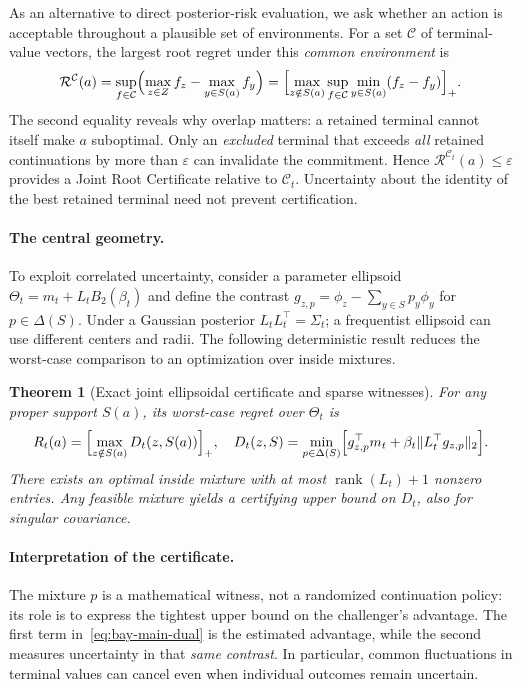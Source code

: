 \documentclass{article}
\theoremstyle{plain}
\newtheorem{theorem}{Theorem}[section]
\theoremstyle{definition}
\begin{document}
As an alternative to direct posterior-risk evaluation, we
ask whether an action is acceptable throughout a plausible
set of environments. For a set $\mathcal C$ of terminal-value
vectors, the largest root regret under this
\emph{common environment} is
\begin{equation}
 \mathcal R^{\mathcal C}(a)
 =\sup_{f\in\mathcal C}
 \Bigl(\max_{z\in Z}f_z-\max_{y\in S(a)}f_y\Bigr)
 =\Bigl[\max_{z\notin S(a)}\sup_{f\in\mathcal C}
 \min_{y\in S(a)}(f_z-f_y)\Bigr]_+.
 \label{eq:robust-definition}
\end{equation}
The second equality reveals why overlap matters: a retained
terminal cannot itself make $a$ suboptimal. Only an
\emph{excluded} terminal that exceeds \emph{all} retained
continuations by more than $\varepsilon$ can invalidate the
commitment. Hence $\mathcal R^{\mathcal C_t}(a)\le\varepsilon$
provides a Joint Root Certificate relative to $\mathcal C_t$.
Uncertainty about the identity of the best retained terminal
need not prevent certification.

\paragraph{The central geometry.}
\label{sec:bay-main}\label{sec:cd-main}
To exploit correlated uncertainty, consider a parameter
ellipsoid $\Theta_t=m_t+L_tB_2(\beta_t)$ and define the
contrast $g_{z,p}=\phi_z-\sum_{y\in S}p_y\phi_y$ for
$p\in\Delta(S)$. Under a Gaussian posterior
$L_tL_t^\top=\Sigma_t$; a frequentist ellipsoid can use
different centers and radii. The following deterministic
result reduces the worst-case comparison to an optimization
over inside mixtures.

\begin{theorem}[Exact joint ellipsoidal certificate and sparse witnesses]
\label{thm:bay-main-dual}\label{thm:t1-dual}
For any proper support $S(a)$, its worst-case regret over
$\Theta_t$ is
\begin{equation}
 R_t(a)=\Bigl[\max_{z\notin S(a)}D_t(z,S(a))\Bigr]_+,\quad
 D_t(z,S)=\min_{p\in\Delta(S)}
 \Bigl[g_{z,p}^\top m_t+\beta_t\|L_t^\top g_{z,p}\|_2\Bigr].
 \label{eq:bay-main-dual}
\end{equation}
There exists an optimal inside mixture with at most
$\operatorname{rank}(L_t)+1$ nonzero entries. Any feasible
mixture yields a certifying \emph{upper} bound on $D_t$,
also for singular covariance.
\end{theorem}

\paragraph{Interpretation of the certificate.}
The mixture $p$ is a mathematical witness, not a randomized
continuation policy: its role is to express the tightest
upper bound on the challenger's advantage. The first term
in~\eqref{eq:bay-main-dual} is the estimated advantage, while
the second measures uncertainty in that \emph{same contrast}.
In particular, common fluctuations in terminal values can
cancel even when individual outcomes remain uncertain.
\end{document}
